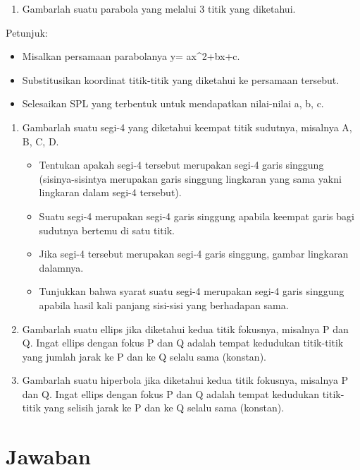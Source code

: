 \documentclass[
]{book}
\providecommand{\tightlist}{%
  \setlength{\itemsep}{0pt}\setlength{\parskip}{0pt}}
\begin{document}
\begin{enumerate}
\def\labelenumi{\arabic{enumi}.}
\setcounter{enumi}{1}
\tightlist
\item
  Gambarlah suatu parabola yang melalui 3 titik yang diketahui.
\end{enumerate}

Petunjuk:

\begin{itemize}
\item
  Misalkan persamaan parabolanya y= ax\^{}2+bx+c.
\item
  Substitusikan koordinat titik-titik yang diketahui ke persamaan tersebut.
\item
  Selesaikan SPL yang terbentuk untuk mendapatkan nilai-nilai a, b, c.
\end{itemize}

\begin{enumerate}
\def\labelenumi{\arabic{enumi}.}
\setcounter{enumi}{2}
\item
  Gambarlah suatu segi-4 yang diketahui keempat titik sudutnya, misalnya A, B, C, D.

  \begin{itemize}
  \item
    Tentukan apakah segi-4 tersebut merupakan segi-4 garis singgung (sisinya-sisintya merupakan garis singgung lingkaran yang sama yakni lingkaran dalam segi-4 tersebut).
  \item
    Suatu segi-4 merupakan segi-4 garis singgung apabila keempat garis bagi sudutnya bertemu di satu titik.
  \item
    Jika segi-4 tersebut merupakan segi-4 garis singgung, gambar lingkaran dalamnya.
  \item
    Tunjukkan bahwa syarat suatu segi-4 merupakan segi-4 garis singgung apabila hasil kali panjang sisi-sisi yang berhadapan sama.
  \end{itemize}
\item
  Gambarlah suatu ellips jika diketahui kedua titik fokusnya, misalnya P dan Q. Ingat ellips dengan fokus P dan Q adalah tempat kedudukan titik-titik yang jumlah jarak ke P dan ke Q selalu sama (konstan).
\item
  Gambarlah suatu hiperbola jika diketahui kedua titik fokusnya, misalnya P dan Q. Ingat ellips dengan fokus P dan Q adalah tempat kedudukan titik-titik yang selisih jarak ke P dan ke Q selalu sama (konstan).
\end{enumerate}

\section{Jawaban}\label{jawaban-1}
\end{document}
